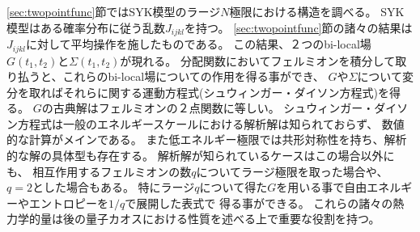 \ref{sec:twopointfunc}節ではSYK模型のラージ$N$極限における構造を調べる。
SYK模型はある確率分布に従う乱数$J_{ijkl}$を持つ。
\ref{sec:twopointfunc}節の諸々の結果は$J_{ijkl}$に対して平均操作を施したものである。
この結果、２つのbi-local場$G(t_1, t_2)$と$\Sigma(t_1, t_2)$が現れる。
分配関数においてフェルミオンを積分して取り払うと、これらのbi-local場についての作用を得る事ができ、
$G$や$\Sigma$について変分を取ればそれらに関する運動方程式(シュウィンガー・ダイソン方程式)を得る。
$G$の古典解はフェルミオンの２点関数に等しい。
シュウィンガー・ダイソン方程式は一般のエネルギースケールにおける解析解は知られておらず、
数値的な計算がメインである。
また低エネルギー極限では共形対称性を持ち、解析的な解の具体型も存在する。
解析解が知られているケースはこの場合以外にも、
相互作用するフェルミオンの数$q$についてラージ極限を取った場合や、
$q=2$とした場合もある。
特にラージ$q$について得た$G$を用いる事で自由エネルギーやエントロピーを$1/q$で展開した表式で
得る事ができる。
これらの諸々の熱力学的量は後の量子カオスにおける性質を述べる上で重要な役割を持つ。

\pagebreak
